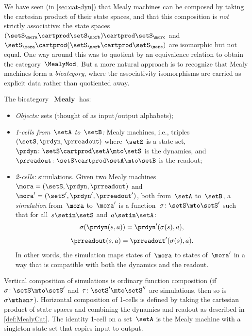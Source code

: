 \begin{example}
    \label{exa:bicat-mealy}
    We have seen (in \cref{sec:cat-dyn}) that Mealy machines can be composed by taking the cartesian product of their state spaces, and that this composition is \emph{not} strictly associative: the state spaces~$(\setS_\mora \cartprod \setS_\morb) \cartprod \setS_\morc$ and~$\setS_\mora \cartprod (\setS_\morb \cartprod \setS_\morc)$ are isomorphic but not equal.
    One way around this was to quotient by an equivalence relation to obtain the category~$\MealyMod$.
    But a more natural approach is to recognize that Mealy machines form a \emph{bicategory}, where the associativity isomorphisms are carried as explicit data rather than quotiented away.

    The bicategory~$\operatorname{\textbf{Mealy}}$ has:
    \begin{itemize}
        \item \emph{Objects:} sets (thought of as input/output alphabets);
        \item \emph{1-cells from~$\setA$ to~$\setB$:} Mealy machines, i.e., triples~$(\setS, \prdyn, \prreadout)$ where~$\setS$ is a state set, $\prdyn \colon \setS \cartprod \setA \mto \setS$ is the dynamics, and~$\prreadout \colon \setS \cartprod \setA \mto \setB$ is the readout;
        \item \emph{2-cells:} simulations.
              Given two Mealy machines~$\mora = (\setS, \prdyn, \prreadout)$ and~$\mora' = (\setS', \prdyn', \prreadout')$, both from~$\setA$ to~$\setB$, a \emph{simulation} from~$\mora$ to~$\mora'$ is a function~$\sigma \colon \setS \mto \setS'$ such that for all~$s \setin \setS$ and~$a \setin \setA$:
              \begin{equation}\label{eq:mealy-simulation-dyn}
                  \sigma(\prdyn(s, a)) = \prdyn'(\sigma(s), a),
              \end{equation}
              \begin{equation}\label{eq:mealy-simulation-ro}
                  \prreadout(s, a) = \prreadout'(\sigma(s), a).
              \end{equation}
              In other words, the simulation maps states of~$\mora$ to states of~$\mora'$ in a way that is compatible with both the dynamics and the readout.
    \end{itemize}
    Vertical composition of simulations is ordinary function composition (if~$\sigma \colon \setS \mto \setS'$ and~$\tau \colon \setS' \mto \setS''$ are simulations, then so is~$\sigma \mthen \tau$).
    Horizontal composition of 1-cells is defined by taking the cartesian product of state spaces and combining the dynamics and readout as described in \cref{def:MealyCat}.
    The identity 1-cell on a set~$\setA$ is the Mealy machine with a singleton state set that copies input to output.


\end{example}
